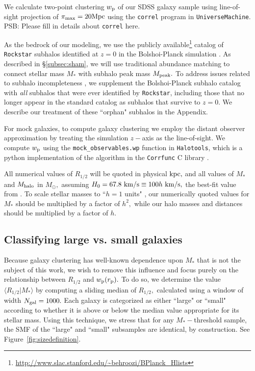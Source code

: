 \documentclass[usenatbib,usegraphicx,letterpaper]{mn2e}
\newcommand{\rhalf}{R_{1/2}}
\newcommand{\mstar}{M_{\ast}}
\newcommand{\mpeak}{M_{\rm peak}}
\newcommand{\mhalo}{M_{\rm halo}}
\newcommand{\rproj}{r_{\rm p}}
\newcommand{\wproj}{w_{\rm p}}
\newcommand{\kpc}{{\rm kpc}}
\newcommand{\mpc}{{\rm Mpc}}
\newcommand{\msun}{M_\odot}
\newcommand{\kms}{{\rm km/s}}
\begin{document}
We calculate two-point clustering $\wproj$ of our SDSS galaxy sample using line-of-sight projection of $\pi_{\rm max}=20\mpc$ using the {\tt correl} program in {\tt UniverseMachine}. {\color{red} PSB: Please fill in details about {\tt correl} here}.

As the bedrock of our modeling, we use the publicly available\footnote{\url{http://www.slac.stanford.edu/~behroozi/BPlanck\_Hlists}} catalog of {\tt Rockstar} subhalos identified at $z=0$ in the Bolshoi-Planck simulation \citep{klypin_etal11,behroozi12_rockstar,behroozi12_consistent_trees,riebe_etal13,rodriguez_puebla16_bolplanck}. As described in \S\ref{subsec:sham}, we will use traditional abundance matching to connect stellar mass $\mstar$ with subhalo peak mass $\mpeak.$ To address issues related to subhalo incompleteness \citep{guo_white13}, we supplement the Bolshoi-Planck subhalo catalog with {\em all} subhalos that were ever identified by {\tt Rockstar}, including those that no longer appear in the standard catalog as subhalos that survive to $z=0.$ We describe our treatment of these ``orphan" subhalos in the Appendix.

For mock galaxies, to compute galaxy clustering we employ the distant observer approximation by treating the simulation $z-$axis as the line-of-sight. We compute $\wproj$ using the {\tt mock\_observables.wp} function in {\tt Halotools}, which is a python implementation of the algorithm in the {\tt Corrfunc} C library \citep{sinha_etal17}.

All numerical values of $\rhalf$ will be quoted in physical $\kpc,$ and all values of $\mstar$ and $\mhalo$ in $\msun,$ assuming $H_0=67.8~\kms\equiv100h~\kms,$ the best-fit value from \citet{planck15}. To scale stellar masses to ``$h=1$ units" \citep{croton13}, our numerically quoted values for $\mstar$ should be multiplied by a factor of $h^2,$ while our halo masses and distances should be multiplied by a factor of $h.$

\subsection{Classifying large vs. small galaxies}
\label{subsec:sizedef}
Because galaxy clustering has well-known dependence upon $\mstar$ that is not the subject of this work, we wish to remove this influence and focus purely on the relationship between $\rhalf$ and $\wproj(\rproj).$ To do so, we determine the value $\langle\rhalf\vert\mstar\rangle$ by computing a sliding median of $\rhalf,$ calculated using a window of width $N_{\rm gal}=1000.$ Each galaxy is categorized as either ``large" or ``small" according to whether it is above or below the median value appropriate for its stellar mass. Using this technique, we stress that for any $\mstar-$threshold sample, the SMF of the ``large" and ``small" subsamples are identical, by construction. See Figure~\ref{fig:sizedefinition}.
\end{document}
